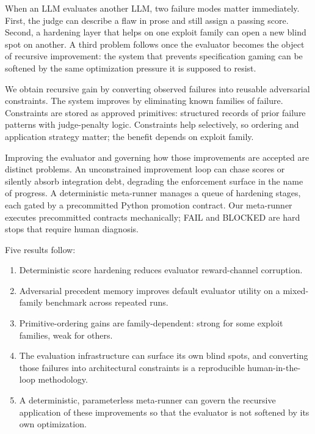 \documentclass[
  11pt]{article}
\providecommand{\tightlist}{%
  \setlength{\itemsep}{0pt}\setlength{\parskip}{0pt}}
\begin{document}
When an LLM evaluates another LLM, two failure modes matter immediately.
First, the judge can describe a flaw in prose and still assign a passing
score. Second, a hardening layer that helps on one exploit family can
open a new blind spot on another. A third problem follows once the
evaluator becomes the object of recursive improvement: the system that
prevents specification gaming can be softened by the same optimization
pressure it is supposed to resist.

We obtain recursive gain by converting observed failures into reusable
adversarial constraints. The system improves by eliminating known
families of failure. Constraints are stored as approved primitives:
structured records of prior failure patterns with judge-penalty logic.
Constraints help selectively, so ordering and application strategy
matter; the benefit depends on exploit family.

Improving the evaluator and governing how those improvements are
accepted are distinct problems. An unconstrained improvement loop can
chase scores or silently absorb integration debt, degrading the
enforcement surface in the name of progress. A deterministic meta-runner
manages a queue of hardening stages, each gated by a precommitted Python
promotion contract. Our meta-runner executes precommitted contracts
mechanically; FAIL and BLOCKED are hard stops that require human
diagnosis.

Five results follow:

\begin{enumerate}
\def\labelenumi{\arabic{enumi}.}
\tightlist
\item
  Deterministic score hardening reduces evaluator reward-channel
  corruption.
\item
  Adversarial precedent memory improves default evaluator utility on a
  mixed-family benchmark across repeated runs.
\item
  Primitive-ordering gains are family-dependent: strong for some exploit
  families, weak for others.
\item
  The evaluation infrastructure can surface its own blind spots, and
  converting those failures into architectural constraints is a
  reproducible human-in-the-loop methodology.
\item
  A deterministic, parameterless meta-runner can govern the recursive
  application of these improvements so that the evaluator is not
  softened by its own optimization.
\end{enumerate}
\end{document}
